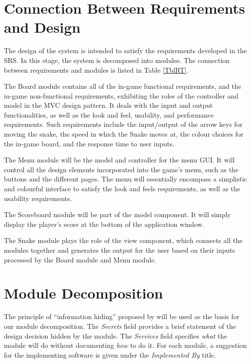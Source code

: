 \documentclass[12pt, titlepage]{article}
\begin{document}
\section{Connection Between Requirements and Design} \label{SecConnection}

The design of the system is intended to satisfy the requirements developed in
the SRS. In this stage, the system is decomposed into modules. The connection
between requirements and modules is listed in Table \ref{TblRT}.

The Board module contains all of the in-game functional requirements, and the in-game non-functional requirements, exhibiting the roles of the controller and model in the MVC design pattern. It deals with the input and output functionalities, as well as the look and feel, usability, and performance requirements. Such requirements include the input/output of the arrow keys for moving the snake, the speed in which the Snake moves at, the colour choices for the in-game board, and the response time to user inputs. 

The Menu module will be the model and controller for the menu GUI. It will control all the design elements incorporated into the game's menu, such as the buttons and the different pages. The menu will essentially encompass a simplistic and colourful interface to satisfy the look and feels requirements, as well as the usability requirements. 

The Scoreboard module will be part of the model component. It will simply display the player's score at the bottom of the application window.

The Snake module plays the role of the view component, which connects all the modules together and generates the output for the user based on their inputs processed by the Board module and Menu module. 

\section{Module Decomposition} \label{SecMD}

The principle of ``information hiding'' proposed by \citet{ParnasEtAl1984} will be used as the basis 
for our module decomposition. The \emph{Secrets} field provides a brief statement of the design decision hidden by the
module. The \emph{Services} field specifies \emph{what} the module will do
without documenting \emph{how} to do it. For each module, a suggestion for the
implementing software is given under the \emph{Implemented By} title. 
\end{document}
